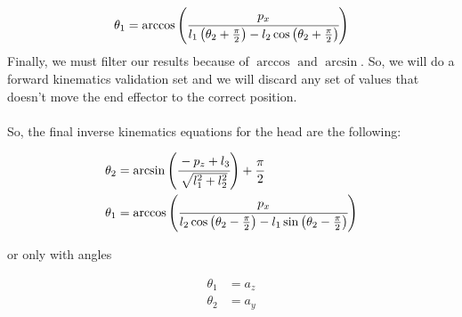 \[
\theta_1 = \arccos\left(\cfrac{p_x}{l_1\left(\theta_2 + \frac{\pi}{2}\right) - l_2\cos\left(\theta_2 + \frac{\pi}{2}\right)}\right)
\]
Finally, we must filter our results because of \(\arccos\text{ and }\arcsin\). So, we will do a forward kinematics validation set and we will discard any set of values that doesn't move the end effector to the correct position.\\
\\
So, the final inverse kinematics equations for the head are the following:\\
\begin{small}
\begin{align*}
\theta_2 &= \arcsin\left(\cfrac{- p_z + l_3}{ \sqrt{l^2_1 + l^2_2} }\right) + \frac{\pi}{2}\\
\theta_1 &= \arccos\left(\cfrac{p_x}{l_2\cos\left(\theta_2 - \frac{\pi}{2}\right) - l_1\sin\left(\theta_2 - \frac{\pi}{2}\right) } \right)
\end{align*}
\end{small}
or only with angles
\begin{small}
\begin{align*}
\theta_1 &= a_z\\
\theta_2 &= a_y
\end{align*}
\end{small}

